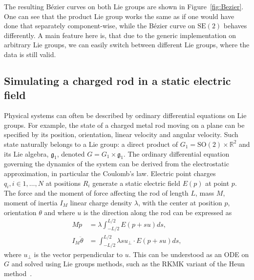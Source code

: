 \documentclass{juliacon}
\begin{document}
The resulting Bézier curves on both Lie groups are shown in Figure~\ref{fig:Bezier}.
One can see that the product Lie group works the same as if one would have done that
separately component-wise, while the Bézier curve on \(\mathrm{SE}(2)\) behaves differently.
A main feature here is, that due to the generic implementation on arbitrary Lie groups,
we can easily switch between different Lie groups, where the data is still valid.

\subsection{Simulating a charged rod in a static electric field}

Physical systems can often be described by ordinary differential equations on Lie groups.
For example, the state of a charged metal rod moving on a plane can be specified by its position, orientation, linear velocity and angular velocity.
Such state naturally belongs to a Lie group: a direct product of \(G_1 = \mathrm{SO}(2) \times \mathbb{R}^2\) and its Lie algebra, \(\mathfrak{g}_1\), denoted \(G = G_1 \times \mathfrak{g}_1\).
The ordinary differential equation governing the dynamics of the system can be derived from the electrostatic approximation, in particular the Coulomb's law.
Electric point charges \(q_i, i \in {1, \dots, N}\) at positions \(R_i\) generate a static electric field \(E(p)\) at point \(p\).
The force and the moment of force affecting the rod of length \(L\), mass \(M\), moment of inertia \(I_M\) linear charge density \(\lambda\), with the center at position \(p\), orientation \(\theta\) and where \(u\) is the direction along the rod can be expressed as
\begin{align}
    M\ddot{p} &= \lambda \int_{-L/2}^{L/2} E(p + su) ds,  \\
    I_M \ddot{\theta} &= \int_{-L/2}^{L/2} \lambda s u_{\perp} \cdot E(p + su) ds,
\end{align}
where \(u_{\perp}\) is the vector perpendicular to \(u\).
This can be understood as an ODE on \(G\) and solved using Lie groups methods, such as the RKMK variant of the Heun method~\cite{IserlesMunthe-KaasNoersettZanna:2000}.
\end{document}
